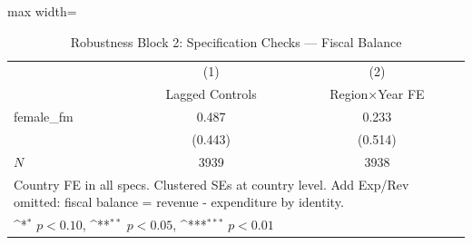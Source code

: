 \begin{table}[htbp]\centering
\def\sym#1{\ifmmode^{#1}\else\(^{#1}\)\fi}
\caption{Robustness Block 2: Specification Checks — Fiscal Balance}
\begin{adjustbox}{max width=\textwidth}
\small
\begin{tabular}{l*{2}{c}}
\hline\hline
            &\multicolumn{1}{c}{(1)}&\multicolumn{1}{c}{(2)}\\
            &\multicolumn{1}{c}{Lagged Controls}&\multicolumn{1}{c}{Region×Year FE}\\
\hline
female\_fm   &       0.487         &       0.233         \\
            &     (0.443)         &     (0.514)         \\
\hline
\(N\)       &        3939         &        3938         \\
\hline\hline
\multicolumn{3}{l}{\footnotesize Country FE in all specs. Clustered SEs at country level.  Add Exp/Rev omitted: fiscal balance = revenue - expenditure by identity.}\\
\multicolumn{3}{l}{\footnotesize \sym{*} \(p<0.10\), \sym{**} \(p<0.05\), \sym{***} \(p<0.01\)}\\
\end{tabular}
\end{adjustbox}
\end{table}
